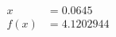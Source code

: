 \documentclass[preview]{standalone}
\begin{document}
\begin{align*}
x &= 0.0645\\f(x) &= 4.1202944
\end{align*}
\end{document}
